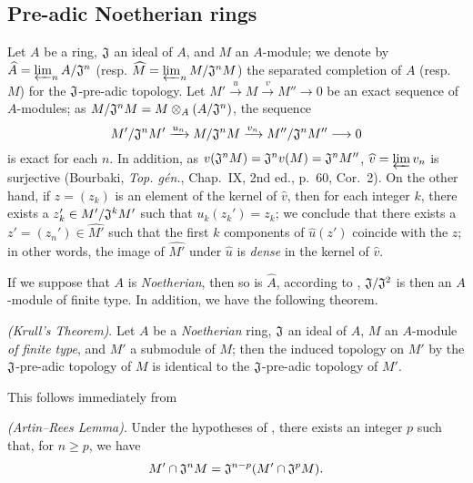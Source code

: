 \subsection{Pre-adic Noetherian rings}
\label{subsection-pre-adic-noetherian-rings}

\begin{env}[7.3.1]
\label{0.7.3.1}
Let $A$ be a ring, $\mathfrak{J}$ an ideal of $A$, and $M$ an $A$-module; we denote by
$\widehat{A}=\varprojlim_n A/\mathfrak{J}^n$
(resp. $\widehat{M}=\varprojlim_n M/\mathfrak{J}^n M$) the separated completion of $A$
(resp. $M$) for the $\mathfrak{J}$-pre-adic topology. Let
$M'\xrightarrow{u}M\xrightarrow{v}M''\to 0$ be an exact sequence of $A$-modules; as
$M/\mathfrak{J}^n M=M\otimes_A(A/\mathfrak{J}^n)$, the sequence
\[
  M'/\mathfrak{J}^n M'\xrightarrow{u_n}M/\mathfrak{J}^n M
  \xrightarrow{v_n}M''/\mathfrak{J}^n M''\longrightarrow 0
\]
is exact for each $n$. In addition, as
$v(\mathfrak{J}^n M)=\mathfrak{J}^n v(M)=\mathfrak{J}^n M''$,
$\widehat{v}=\varprojlim v_n$ is surjective (Bourbaki, {\em Top. g\'en.}, Chap.~IX,
2nd ed., p.~60, Cor.~2). On the other hand, if $z=(z_k)$ is an element of the kernel of
$\widehat{v}$, then for each integer $k$, there exists a $z_k'\in M'/\mathfrak{J}^k M'$
such that $u_k(z_k')=z_k$; we conclude that there exists  a $z'=(z_n')\in\widehat{M'}$
such that the first $k$ components of $\widehat{u}(z')$ coincide with the $z$; in other
words, the image of $\widehat{M'}$ under $\widehat{u}$ is {\em dense} in the kernel of
$\widehat{v}$.

If we suppose that $A$ is {\em Noetherian}, then so is $\widehat{A}$, according to
, $\mathfrak{J}/\mathfrak{J}^2$ is then an $A$-module of
finite type. In addition, we have the following theorem.
\end{env}

\begin{thm}[7.3.2]
\label{0.7.3.2}
{\em (Krull's Theorem)}. Let $A$ be a {\em Noetherian} ring, $\mathfrak{J}$ an ideal of
$A$, $M$ an $A$-module {\em of finite type}, and $M'$ a submodule of $M$; then the induced
topology on $M'$ by the $\mathfrak{J}$-pre-adic topology of $M$ is identical to the
$\mathfrak{J}$-pre-adic topology of $M'$.
\end{thm}

This follows immediately from
\begin{lem}[7.3.2.1]
\label{0.7.3.2.1}
{\em (Artin--Rees Lemma)}. Under the hypotheses of , there
exists an integer $p$ such that, for $n\geqslant p$, we have
\[
  M'\cap\mathfrak{J}^n M=\mathfrak{J}^{n-p}(M'\cap\mathfrak{J}^p M).
\]
\end{lem}

